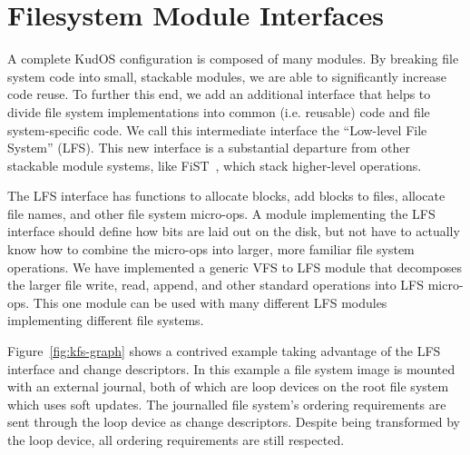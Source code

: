 \preparagraphspacing{}
\section*{Filesystem Module Interfaces}
\label{sec:interfaces}

A complete KudOS configuration is composed of many modules.
By breaking file system code into
small, stackable modules, we are able to significantly increase code reuse. To
further this end, we add an additional interface that helps to divide file system
implementations into common (i.e. reusable) code and file system-specific code.
We call this intermediate interface the ``Low-level File System'' (LFS). This
new interface is a substantial departure from other stackable module systems,
like FiST~\cite{zadok00fist}, which stack higher-level operations.

The LFS interface has functions to allocate blocks, add blocks to
files, allocate file names, and other file system micro-ops. A module
implementing the LFS interface should define how bits are laid out on
the disk, but not have to actually know how to combine the micro-ops
into larger, more familiar file system operations. We have implemented
a generic VFS to LFS module that decomposes the larger file write,
read, append, and other standard operations into LFS micro-ops. This
one module can be used with many different LFS modules implementing
different file systems.

Figure~\ref{fig:kfs-graph} shows a contrived example taking advantage of the LFS
interface and change descriptors. In this example a file system image is mounted
with an external journal, both of which are loop devices on the root file system
which uses soft updates. The journalled file system's ordering requirements are
sent through the loop device as change descriptors. Despite being transformed
by the loop device, all ordering requirements are still respected.
